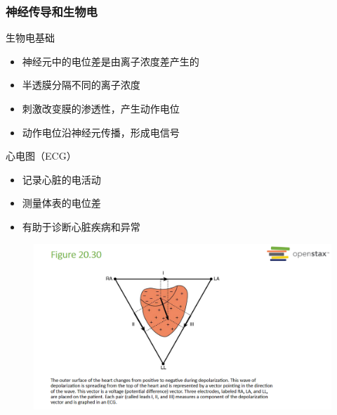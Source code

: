\documentclass{beamer}
\begin{document}
\begin{frame}
    \frametitle{神经传导和生物电}
    \begin{block}{生物电基础}
        \begin{itemize}
            \item 神经元中的电位差是由离子浓度差产生的
            \item 半透膜分隔不同的离子浓度
            \item 刺激改变膜的渗透性，产生动作电位
            \item 动作电位沿神经元传播，形成电信号
        \end{itemize}
    \end{block}
    \begin{block}{心电图（ECG）}
        \begin{itemize}
            \item 记录心脏的电活动
            \item 测量体表的电位差
            \item 有助于诊断心脏疾病和异常
        \end{itemize}
    \end{block}
\end{frame}
\begin{frame}{}
    \begin{figure}
        \centering
        \includegraphics[width=1\linewidth]{phys12-circuits-ecg-waveform.png}
    \end{figure}
\end{frame}

\end{document}
